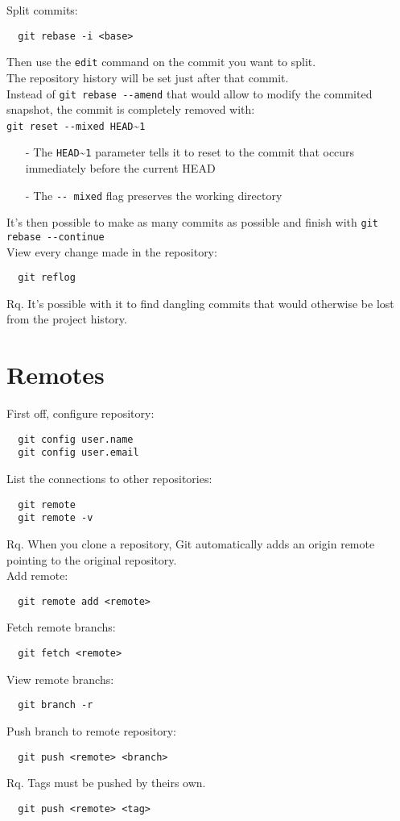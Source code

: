 \documentclass[french]{article}
\begin{document}
Split commits:
\begin{verbatim}
  git rebase -i <base>
\end{verbatim}
Then use the \verb|edit| command on the commit you want to split.\\
The repository history will be set just after that commit.\\
Instead of \verb|git rebase --amend| that would allow to modify the commited snapshot, the commit is completely removed with: \\ \verb|git reset --mixed HEAD|\textasciitilde \verb|1|
\begin{itemize}
  \item [-] The \verb|HEAD|\textasciitilde \verb|1| parameter tells it to reset to the commit that occurs immediately before the current HEAD
  \item [-] The \verb|-- mixed| flag preserves the working directory
\end{itemize}
It's then possible to make as many commits as possible and finish with \verb|git rebase --continue|\\

View every change made in the repository:
\begin{verbatim}
  git reflog
\end{verbatim}
Rq. It's possible with it to find dangling commits that would otherwise be lost from the project history.

\section{Remotes}

First off, configure repository:
\begin{verbatim}
  git config user.name
  git config user.email
\end{verbatim}

List the connections to other repositories:
\begin{verbatim}
  git remote
  git remote -v
\end{verbatim}
Rq. When you clone a repository, Git automatically adds an origin remote pointing to the original repository. \\

Add remote:
\begin{verbatim}
  git remote add <remote>
\end{verbatim}

Fetch remote branchs:
\begin{verbatim}
  git fetch <remote>
\end{verbatim}

View remote branchs:
\begin{verbatim}
  git branch -r
\end{verbatim}

Push branch to remote repository:
\begin{verbatim}
  git push <remote> <branch>
\end{verbatim}

Rq. Tags must be pushed by theirs own.
\begin{verbatim}
  git push <remote> <tag>
\end{verbatim}
\end{document}
